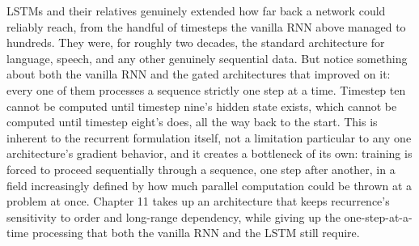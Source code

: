 LSTMs and their relatives genuinely extended how far back a network could reliably reach, from the handful of timesteps the vanilla RNN above managed to hundreds. They were, for roughly two decades, the standard architecture for language, speech, and any other genuinely sequential data. But notice something about both the vanilla RNN and the gated architectures that improved on it: every one of them processes a sequence strictly one step at a time. Timestep ten cannot be computed until timestep nine's hidden state exists, which cannot be computed until timestep eight's does, all the way back to the start. This is inherent to the recurrent formulation itself, not a limitation particular to any one architecture's gradient behavior, and it creates a bottleneck of its own: training is forced to proceed sequentially through a sequence, one step after another, in a field increasingly defined by how much parallel computation could be thrown at a problem at once. Chapter 11 takes up an architecture that keeps recurrence's sensitivity to order and long-range dependency, while giving up the one-step-at-a-time processing that both the vanilla RNN and the LSTM still require.
